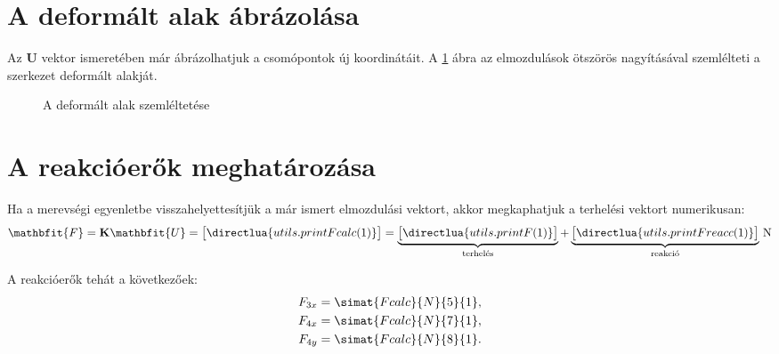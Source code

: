 \documentclass[a4paper, 12pt]{scrartcl}
\newcommand{\rvec}[1]{\mathbfit{#1}}
\newcommand{\rmat}[1]{\mathbf{#1}}
\begin{document}



\section{A deformált alak ábrázolása} %
\label{sec:A deformált alak ábrázolása}

Az $\rmat U$ vektor ismeretében már ábrázolhatjuk a csomópontok új koordinátáit.
A \ref{fig:deformed} ábra az elmozdulások ötszörös nagyításával szemlélteti a
szerkezet deformált alakját.

\begin{figure}[H]
  \centering
  
  \caption{A deformált alak szemléltetése}
  \label{fig:deformed}
\end{figure}




\section{A reakcióerők meghatározása} %
\label{sec:A reakcióerők meghatározása}

Ha a merevségi egyenletbe visszahelyettesítjük a már ismert elmozdulási vektort,
akkor megkaphatjuk a terhelési vektort numerikusan:
\begin{equation}
  \rvec F = \rmat K \rvec U =
  \sisetup{
    exponent-mode = fixed,
    round-precision = 3
  }
  \begin{bmatrix}
    \directlua{utils.printFcalc(1)}
  \end{bmatrix}
  =
  \underbrace{\begin{bmatrix}
      \directlua{utils.printF(1)}
    \end{bmatrix}}_\text{terhelés}
  +
  \underbrace{\begin{bmatrix}
      \directlua{utils.printFreacc(1)}
    \end{bmatrix}}_\text{reakció}
  \, \mathrm{N}
  \label{eq:Fcalc}
\end{equation}

A reakcióerők tehát a következőek:
\begin{equation}
  \sisetup{
    exponent-mode = fixed,
    round-precision = 3
  }
  \begin{split}
    F_{3x} &= \simat{Fcalc}{N}{5}{1},
    \\
    F_{4x} &= \simat{Fcalc}{N}{7}{1},
    \\
    F_{4y} &= \simat{Fcalc}{N}{8}{1}.
  \end{split}
\end{equation}
\end{document}

